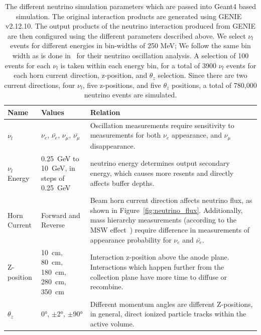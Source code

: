 \begin{table}
\begin{center}
\begin{tabular}{|| p{30mm} | p{30mm} | p{90mm} ||}
 \hline
 Name & Values & Relation \\ [0.5ex]
 \hline\hline
  $\nu_{l}$ & $\nu_{e}$, $\bar{\nu_{e}}$, $\nu_{\mu}$, $\bar{\nu_{\mu}}$ & Oscillation measurements require sensitivity to measurements for both $\nu_{e}$ appearance, and $\nu_{\mu}$ disappearance.\\
 \hline
  $\nu_{l}$ Energy & 0.25~\unit{GeV} to 10~\unit{GeV}, in steps of 0.25~\unit{GeV} & neutrino energy determines output secondary energy, which causes more resents and directly affects buffer depths. \\
 \hline
  Horn Current & Forward and Reverse & Beam horn current direction affects neutrino flux, as shown in Figure~\ref{fig:neutrino_flux}. Additionally, mass hierarchy measurements (according to the MSW effect~\citep{Smirnov2004TheME}) require difference in measurements of appearance probability for $\nu_{e}$ and $\bar{\nu_{e}}$. \\
 \hline
  Z-position & 10~\unit{cm}, 80~\unit{cm}, 180~\unit{cm}, 280~\unit{cm}, 350~\unit{cm}  & Interaction z-position above the anode plane. Interactions which happen further from the collection plane have more time to diffuse or recombine. \\
 \hline
  $\theta_{z} $ & 0\unit{\degree}, $\pm$2\unit{\degree}, $\pm$90\unit{\degree} & Different momentum angles are different Z-positions, in general, direct ionized particle tracks within the active volume. \\
 \hline
\end{tabular}
\caption{The different neutrino simulation parameters which are passed into Geant4 based simulation.
  The original interaction products are generated using GENIE~\citep{Andreopoulos:2009rq} v2.12.10.
  The output products of the neutrino interaction produced from GENIE are then configured using the different parameters described above.
  We select $\nu_{l}$ events for different energies in bin-widths of 250 MeV; We follow the same bin width as is done in~\citep{DUNE_FD_TDRv2_2020} for their neutrino oscillation analysis.
  A selection of 100 events for each $\nu_{l}$ is taken within each energy bin, for a total of 3900 $\nu_{l}$ events for each horn current direction, z-position, and $\theta_{z}$ selection.
  Since there are two current directions, four $\nu_{l}$, five z-positions, and five $\theta_{z}$ positions, a total of 780,000 neutrino events are simulated.
}
\label{table:neutrino_params}
\end{center}
\end{table}

